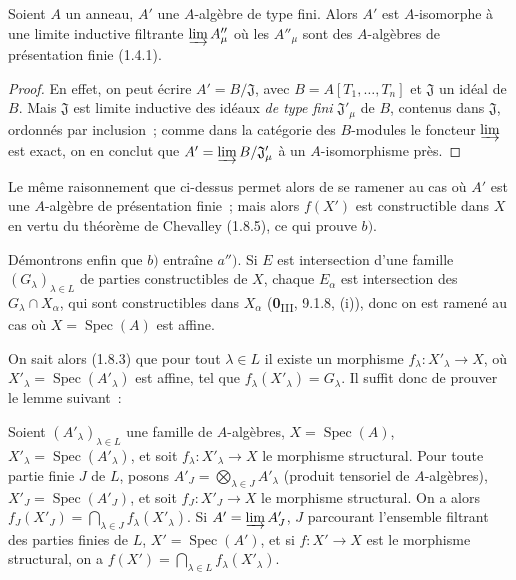 
\begin{lemma}[1.9.3.1]
\label{IV.1.9.3.1-fr}
Soient $A$ un anneau, $A'$ une $A$-algèbre de type fini. Alors $A'$ est
$A$-isomorphe à une limite inductive filtrante $\varinjlim A''_\mu$ où les
$A''_\mu$ sont des $A$-algèbres de présentation finie \textup{(1.4.1)}.
\end{lemma}

\begin{proof}
En effet, on peut écrire $A'=B/\mathfrak J$, avec
$B=A[T_1,\ldots,T_n]$ et $\mathfrak J$ un idéal de $B$. Mais $\mathfrak J$
est limite inductive des idéaux \emph{de type fini} $\mathfrak J'_\mu$ de
$B$, contenus dans $\mathfrak J$, ordonnés par inclusion~; comme dans la
catégorie des $B$-modules le foncteur $\varinjlim$ est exact, on en conclut
que $A'=\varinjlim B/\mathfrak J'_\mu$ à un $A$-isomorphisme près.
\end{proof}

Le même raisonnement que ci-dessus permet alors de se ramener au cas où $A'$
est une $A$-algèbre de présentation finie~; mais alors $f(X')$ est
constructible dans $X$ en vertu du théorème de Chevalley (1.8.5), ce qui
prouve $b)$.

Démontrons enfin que $b)$ entraîne $a'')$. Si $E$ est intersection d'une
famille $(G_\lambda)_{\lambda\in L}$ de parties constructibles de $X$,
chaque $E_\alpha$ est intersection des $G_\lambda\cap X_\alpha$, qui sont
constructibles dans $X_\alpha$ (\textbf{0}\textsubscript{III}, 9.1.8, (i)), donc on
est ramené au cas où $X=\operatorname{Spec}(A)$ est affine.

On sait alors (1.8.3) que pour tout $\lambda\in L$ il existe un morphisme
$f_\lambda:X'_\lambda\to X$, où
$X'_\lambda=\operatorname{Spec}(A'_\lambda)$ est affine, tel que
$f_\lambda(X'_\lambda)=G_\lambda$. Il suffit donc de prouver le lemme
suivant~:

\begin{lemma}[1.9.3.2]
\label{IV.1.9.3.2-fr}
Soient $(A'_\lambda)_{\lambda\in L}$ une famille de $A$-algèbres,
$X=\operatorname{Spec}(A)$, $X'_\lambda=\operatorname{Spec}(A'_\lambda)$,
et soit $f_\lambda:X'_\lambda\to X$ le morphisme structural. Pour toute
partie finie $J$ de $L$, posons
$A'_J=\bigotimes_{\lambda\in J}A'_\lambda$ (produit tensoriel de
$A$-algèbres), $X'_J=\operatorname{Spec}(A'_J)$, et soit $f_J:X'_J\to X$ le
morphisme structural. On a alors
$f_J(X'_J)=\bigcap_{\lambda\in J}f_\lambda(X'_\lambda)$. Si
$A'=\varinjlim A'_J$, $J$ parcourant l'ensemble filtrant des parties finies
de $L$, $X'=\operatorname{Spec}(A')$, et si $f:X'\to X$ est le morphisme
structural, on a $f(X')=\bigcap_{\lambda\in L}f_\lambda(X'_\lambda)$.
\end{lemma}

